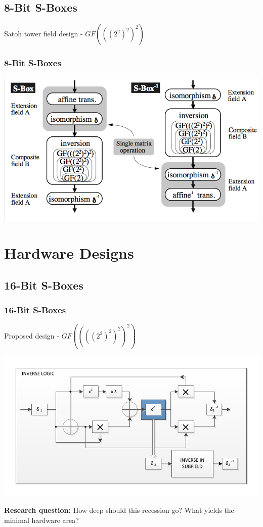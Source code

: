 \documentclass[handout]{beamer}
\begin{document}
\subsection{8-Bit S-Boxes}
\begin{frame}
	Satoh tower field design - $GF(((2^2)^2)^2)$
	\frametitle{8-Bit S-Boxes}
	\begin{center}
	\includegraphics[scale=.35]{./images/tower8bit.png}
	\end{center}
\end{frame}

\section{Hardware Designs}
\subsection{16-Bit S-Boxes}
\begin{frame}
	\frametitle{16-Bit S-Boxes}
	Proposed design - $GF((((2^2)^2)^2)^2)$
	\begin{center}
	\includegraphics[scale=0.65]{./images/composite_field_inverter.pdf}
	\end{center}
	\textbf{Research question:} How deep should this recession go? What yields the minimal hardware area?
\end{frame}
\end{document}
